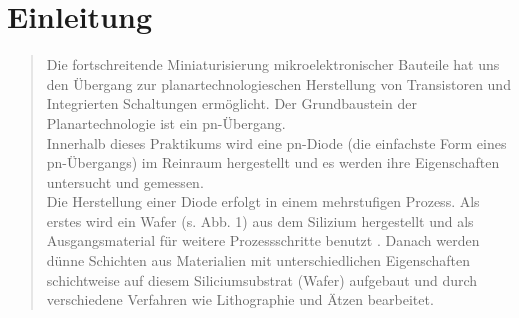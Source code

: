 \newcommand{\institut}{}
\newcommand{\fachgebiet}{Halbleiterbauelemente}
\newcommand{\veranstaltung}{Praktikum Technologie und Bauelemente der Halbleitertechnik}
\newcommand{\pdfautor}{Dirk Barbendererde (321 836), Thomas Kapa (), Alona
Siebert (), Özgü Dogan (326048)}
\newcommand{\autor}{Dirk Barbendererde (321 836)\\ Thomas Kapa ()\\ Alona
Siebert ()\\ Özgü Dogan (326 048)}
\newcommand{\pdftitle}{Praktikum\ Technologie und Bauelemente der
Halbleitertechnik}
\newcommand{\prototitle}{Praktikum Technologie und Bauelemente der Halbleitertechnik}
\newcommand{\aufgabe}{}

\newcommand{\gruppe}{Gruppe 1}
\newcommand{\betreuer}{Betreuer:\\ Clemens Helfmeier\\ Philipp Scholz}





\setcaptionwidth{7.5cm}




%     




\section{Einleitung}
\begin{quote}

	Die fortschreitende Miniaturisierung mikroelektronischer Bauteile hat uns 
	den Übergang zur planartechnologieschen Herstellung  von Transistoren und 
	Integrierten Schaltungen ermöglicht. Der Grundbaustein der Planartechnologie 
	ist ein pn-Übergang.\\

	Innerhalb dieses Praktikums wird eine pn-Diode (die einfachste Form eines 
	pn-Übergangs) im Reinraum hergestellt und es werden ihre Eigenschaften 
	untersucht und gemessen.\\

	Die Herstellung einer Diode erfolgt in einem mehrstufigen Prozess.
 	Als erstes wird ein Wafer (s. Abb. 1) aus dem Silizium hergestellt und als 
 	Ausgangsmaterial für weitere Prozessschritte benutzt . Danach werden dünne 
 	Schichten aus Materialien mit unterschiedlichen Eigenschaften schichtweise 
 	auf diesem Siliciumsubstrat (Wafer) aufgebaut und durch verschiedene 
 	Verfahren wie Lithographie und Ätzen bearbeitet.\\
 	

\end{quote} %

